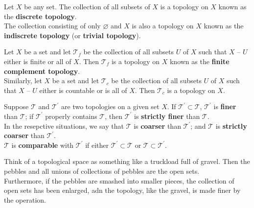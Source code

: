 \begin{eg}
Let $X$ be any set. The collection of all subsets of $X$ is a topology on $X$ known as the \textbf{discrete topology}. \\

The collection consisting of only $\varnothing$ and $X$ is also a topology on $X$ known as the \textbf{indiscrete topology} (or \textbf{trivial topology}).
\end{eg}

\begin{eg}
Let $X$ be a set and let $\mathscr{T}_f$ be the collection of all subsets $U$ of $X$ such that $X\text{ -- }U$ either is finite or all of $X$. Then $\mathscr{T}_f$ is a topology on $X$
known as the \textbf{finite complement topology}. \\

Similarly, let $X$ be a set and let $\mathscr{T}_c$ be the collection of all subsets $U$ of $X$ such that $X\text{ -- }U$ either is countable or is all of $X$. 
Then $\mathscr{T}_c$ is a topology on $X$.
\end{eg}

\begin{definition}
Suppose $\mathscr{T}$ and $\mathscr{T}^{\prime}$ are two topologies on a given set $X$. If $\mathscr{T}^{\prime} \subset \mathscr{T}$, $\mathscr{T}^{\prime}$ is \textbf{finer} than $\mathscr{T}$;
if $\mathscr{T}^{\prime}$ properly contains $\mathscr{T}$, then $\mathscr{T}^{\prime}$ is \textbf{strictly finer} than $\mathscr{T}$. \\

In the resepctive situations, we say that $\mathscr{T}$ is \textbf{coarser} than $\mathscr{T^{\prime}}$;
and $\mathscr{T}$ is \textbf{strictly coarser} than $\mathscr{T}^{\prime}$. \\

$\mathscr{T}$ is \textbf{comparable} with $\mathscr{T}^{\prime}$ if either $\mathscr{T}^{\prime} \subset \mathscr{T}$ or $\mathscr{T} \subset \mathscr{T}^{\prime}$.
\end{definition}

\begin{intuition}
Think of a topological space as something like a truckload full of gravel. Then the pebbles and all unions of collections of pebbles are the open sets.\\

Furthermore, if the pebbles are smashed into smaller pieces, the collection of open sets has been enlarged, adn the topology, like the gravel, is made finer by the operation.
\end{intuition}

